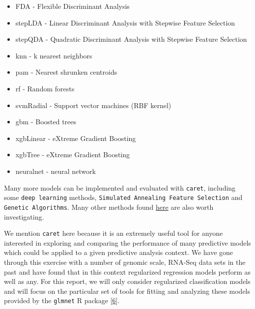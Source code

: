 \documentclass[
]{book}
\providecommand{\tightlist}{%
  \setlength{\itemsep}{0pt}\setlength{\parskip}{0pt}}
\begin{document}
\begin{itemize}
\tightlist
\item
  FDA - Flexible Discriminant Analysis\\
\item
  stepLDA - Linear Discriminant Analysis with Stepwise Feature Selection\\
\item
  stepQDA - Quadratic Discriminant Analysis with Stepwise Feature Selection\\
\item
  knn - k nearest neighbors\\
\item
  pam - Nearest shrunken centroids\\
\item
  rf - Random forests\\
\item
  svmRadial - Support vector machines (RBF kernel)\\
\item
  gbm - Boosted trees\\
\item
  xgbLinear - eXtreme Gradient Boosting\\
\item
  xgbTree - eXtreme Gradient Boosting\\
\item
  neuralnet - neural network
\end{itemize}

Many more models can be implemented and evaluated with \texttt{caret},
including some \texttt{deep\ learning} methods, \texttt{Simulated\ Annealing\ Feature\ Selection}
and \texttt{Genetic\ Algorithms}.
Many other methods found \href{https://topepo.github.io/caret/available-models.html}{here}
are also worth investigating.

We mention \texttt{caret} here because it is an extremely useful tool for
anyone interested in exploring and comparing the performance of
many predictive models which could be applied to a given predictive
analysis context. We have gone through this exercise with a number
of genomic scale, RNA-Seq data sets in the past and have found
that in this context regularized regression models perform
as well as any. For this report, we will only consider regularized classification
models and will focus on the particular set of tools for fitting and analyzing
these models provided by the \texttt{glmnet} R package {[}\protect\hyperlink{ref-Friedman:2010aa}{6}{]}.
\end{document}
